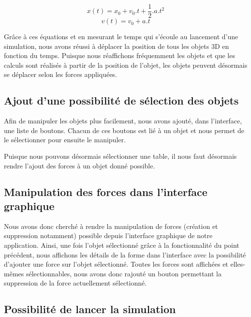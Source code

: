 \documentclass[11pt]{report}
\begin{document}
\[
      x(t) = x_{0} + v_{0} . t + \frac{1}{2}.a.t^{2}
\]
\[
      v(t) = v_{0} + a.t
\]

Grâce à ces équations et en mesurant le temps qui s'écoule au lancement d'une simulation, nous avons réussi à déplacer
la position de tous les objets 3D en fonction du temps. Puisque nous réaffichons fréquemment les objets et que les calculs sont réalisés
à partir de la position de l'objet, les objets peuvent désormais se déplacer selon les forces appliquées.\newline


\subsection{Ajout d'une possibilité de sélection des objets}

Afin de manipuler les objets plus facilement, nous avons ajouté, dans l'interface, une liste de boutons. Chacun de ces boutons est lié à un objet et nous permet de le sélectionner pour ensuite le manipuler.

Puisque nous pouvons désormais sélectionner une table, il nous faut désormais rendre l'ajout des forces à un objet donné possible.


\subsection{Manipulation des forces dans l'interface graphique}

Nous avons donc cherché à rendre la manipulation de forces (création et suppression notamment) possible depuis l'interface graphique de notre application. Ainsi, une fois l'objet sélectionné grâce à la fonctionnalité du point précédent, nous affichons les détails de la forme dans l'interface avec la possibilité d'ajouter une force sur l'objet sélectionné. Toutes les forces sont affichées et elles-mêmes sélectionnables, nous avons donc rajouté un bouton permettant la suppression de la force actuellement sélectionné.


\subsection{Possibilité de lancer la simulation}
\end{document}

